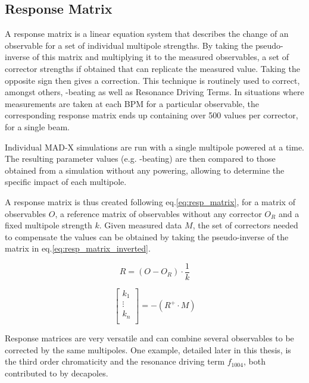 \subsection{Response Matrix}

A response matrix is a linear equation system that describes the change of an observable for a set of individual multipole strengths. By taking the pseudo-inverse of this matrix and multiplying it to the measured observables, a set of corrector strengths if obtained that can replicate the measured value. Taking the opposite sign then gives a correction.
This technique is routinely used to correct, amongst others, \beta-beating as well as Resonance Driving Terms. In situations where measurements are taken at each BPM for a particular observable, the corresponding response matrix ends up containing over 500 values per corrector, for a single beam.

Individual MAD-X simulations are run with a single multipole powered at a time. The resulting parameter values (e.g. \beta-beating) are then compared to those obtained from a simulation without any powering, allowing to determine the specific impact of each multipole.

A response matrix is thus created following eq.\ref{eq:resp_matrix}, for a matrix of observables $O$, a reference matrix of observables without any corrector $O_R$ and a fixed multipole strength $k$. Given measured data $M$, the set of correctors needed to compensate the values can be obtained by taking the pseudo-inverse of the matrix in eq.\ref{eq:resp_matrix_inverted}.

\begin{equation}
  R = \left(O - O_R \right) \cdot \frac{1}{k}
  \label{eq:resp_matrix}
\end{equation}

\begin{equation}
  \begin{bmatrix}
    k_1 \\
    \vdots \\
    k_n \\
  \end{bmatrix}
  = -(R^{+} \cdot M)
  \label{eq:resp_matrix_inverted}
\end{equation}
 
Response matrices are very versatile and can combine several observables to be corrected by the same multipoles. One example, detailed later in this thesis, is the third order chromaticity and the resonance driving term $f_{1004}$, both contributed to by decapoles.

